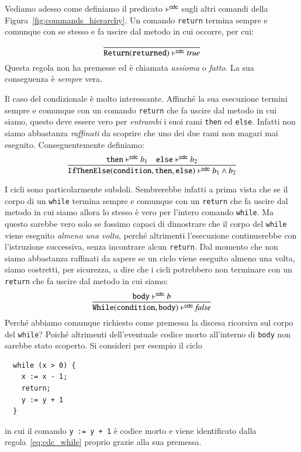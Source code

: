 Vediamo adesso come definiamo il predicato $\vdash^{\mathsf{cdc}}$ sugli altri comandi
della Figura~\ref{fig:commands_hierarchy}. Un comando \texttt{return}
termina sempre e comunque con se stesso e fa uscire dal metodo in cui
occorre, per cui:
%
\[
  \frac{}{\mathtt{Return(returned)}\vdash^{\mathsf{cdc}}\mathit{true}}
\]
%
Questa regola non ha premesse ed \`e chiamata \emph{assioma} o \emph{fatto}.
La sua conseguenza \`e \emph{sempre} vera.

Il caso del condizionale \`e molto interessante. Affinch\'e la sua esecuzione
termini sempre e comunque con un comando \texttt{return} che fa uscire
dal metodo in cui siamo, questo deve essere
vero per \emph{entrambi} i suoi rami \texttt{then} ed \texttt{else}. Infatti
non siamo abbastanza \emph{raffinati} da scoprire che uno dei due
rami non \e magari mai eseguito. Conseguentemente definiamo:
%
\begin{equation}\label{eq:cdc_ifthenelse}
  \frac{\mathtt{then}\vdash^{\mathsf{cdc}} b_1\quad\mathtt{else}\vdash^{\mathsf{cdc}} b_2}
    {\mathtt{IfThenElse(condition,then,else)}\vdash^{\mathsf{cdc}} b_1\wedge b_2}
\end{equation}

I cicli sono particolarmente subdoli. Sembrerebbe infatti a prima vista che se
il corpo di un \texttt{while} termina sempre e comunque con un \texttt{return}
che fa uscire dal metodo in cui siamo
allora lo stesso \`e vero per l'intero comando \texttt{while}.
Ma questo sarebbe vero solo se fossimo capaci di dimostrare
che il corpo del \texttt{while} viene eseguito \emph{almeno una volta},
perch\'e altrimenti l'esecuzione continuerebbe
con l'istruzione successiva, senza
incontrare alcun \texttt{return}. Dal momento che non siamo abbastanza
raffinati da sapere se un ciclo viene eseguito almeno una volta, siamo
costretti, per sicurezza, a dire che i cicli potrebbero non terminare con un
\texttt{return} che fa uscire dal metodo in cui siamo:
%
\begin{equation}\label{eq:cdc_while}
  \frac{\mathtt{body}\vdash^{\mathsf{cdc}} b}
    {\mathtt{While(condition,body)}\vdash^{\mathsf{cdc}}\mathit{false}}
\end{equation}
%
Perch\'e abbiamo comunque richiesto come premessa la discesa ricorsiva sul
corpo del \texttt{while}? Poich\'e altrimenti dell'eventuale codice morto
all'interno di \texttt{body} non sarebbe stato scoperto. Si consideri per
esempio il ciclo
%
\begin{verbatim}
  while (x > 0) {
    x := x - 1;
    return;
    y := y + 1
  }
\end{verbatim}
%
in cui il comando \texttt{y := y + 1} \`e codice morto e viene identificato
dalla regola~\eqref{eq:cdc_while} proprio grazie alla sua premessa.

